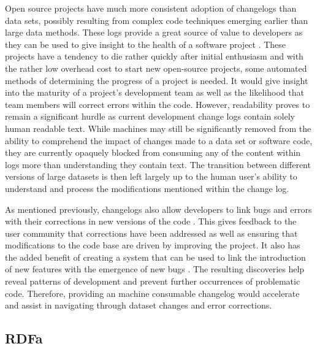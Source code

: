 Open source projects have much more consistent adoption of changelogs than data sets, possibly resulting from complex code techniques emerging earlier than large data methods.
These logs provide a great source of value to developers as they can be used to give insight to the health of a software project \cite{German03automatingthe}.
These projects have a tendency to die rather quickly after initial enthusiasm and with the rather low overhead cost to start new open-source projects, some automated methods of determining the progress of a project is needed.
It would give insight into the maturity of a project's development team as well as the likelihood that team members will correct errors within the code.
However, readability proves to remain a significant hurdle as current development change logs contain solely human readable text.
While machines may still be significantly removed from the ability to comprehend the impact of changes made to a data set or software code, they are currently opaquely blocked from consuming any of the content within logs more than understanding they contain text.
The transition between different versions of large datasets is then left largely up to the human user's ability to understand and process the modifications mentioned within the change log.

As mentioned previously, changelogs also allow developers to link bugs and errors with their corrections in new versions of the code \cite{Chen:2004:OCL:990374.990391}.
This gives feedback to the user community that corrections have been addressed as well as ensuring that modifications to the code base are driven by improving the project.
It also has the added benefit of creating a system that can be used to link the introduction of new features with the emergence of new bugs \cite{6132954}.
The resulting discoveries help reveal patterns of development and prevent further occurrences of problematic code.
Therefore, providing an machine consumable changelog would accelerate and assist in navigating through dataset changes and error corrections.

\subsection{RDFa}

